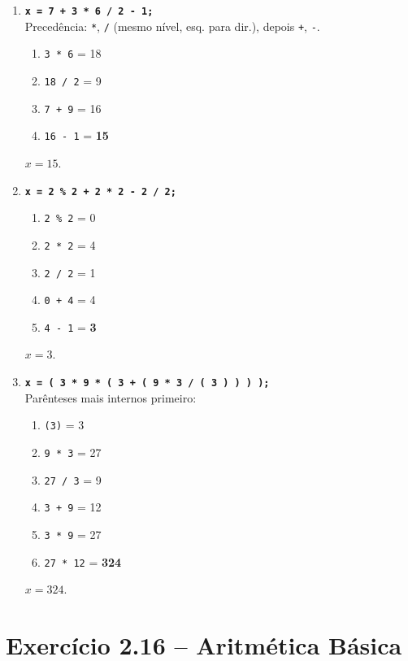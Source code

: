 \documentclass[12pt,a4paper]{article}
\begin{document}
\begin{respostabox}
\begin{enumerate}[label=\textbf{\alph*)}]

\item \textbf{\texttt{x = 7 + 3 * 6 / 2 - 1;}}\\
Precedência: \texttt{*}, \texttt{/} (mesmo nível, esq. para dir.), depois \texttt{+}, \texttt{-}.
\begin{enumerate}[label=\arabic*.]
  \item \texttt{3 * 6} = 18
  \item \texttt{18 / 2} = 9
  \item \texttt{7 + 9} = 16
  \item \texttt{16 - 1} = \textbf{15}
\end{enumerate}
$x = 15$.

\item \textbf{\texttt{x = 2 \% 2 + 2 * 2 - 2 / 2;}}\\
\begin{enumerate}[label=\arabic*.]
  \item \texttt{2 \% 2} = 0
  \item \texttt{2 * 2} = 4
  \item \texttt{2 / 2} = 1
  \item \texttt{0 + 4} = 4
  \item \texttt{4 - 1} = \textbf{3}
\end{enumerate}
$x = 3$.

\item \textbf{\texttt{x = ( 3 * 9 * ( 3 + ( 9 * 3 / ( 3 ) ) ) );}}\\
Parênteses mais internos primeiro:
\begin{enumerate}[label=\arabic*.]
  \item \texttt{(3)} = 3
  \item \texttt{9 * 3} = 27
  \item \texttt{27 / 3} = 9
  \item \texttt{3 + 9} = 12
  \item \texttt{3 * 9} = 27
  \item \texttt{27 * 12} = \textbf{324}
\end{enumerate}
$x = 324$.

\end{enumerate}
\end{respostabox}

\section{Exercício 2.16 -- Aritmética Básica}
\end{document}
